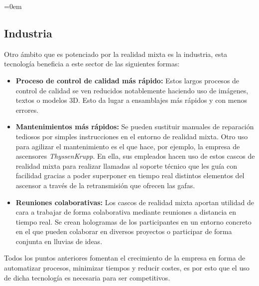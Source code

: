 \parindent=0em
\subsection{Industria}
\noindent




Otro ámbito que es potenciado por la realidad mixta es la industria, esta tecnología beneficia a este sector de las siguientes formas:

\begin{itemize}
    \item \textbf{Proceso de control de calidad más rápido:} Estos largos procesos de control de calidad se ven reducidos notablemente haciendo uso de imágenes, textos o modelos 3D. Esto da lugar a ensamblajes más rápidos y con menos errores.
    
     \item \textbf{Mantenimientos más rápidos:} Se pueden sustituir manuales de reparación tediosos por simples instrucciones en el entorno de realidad mixta. Otro uso para agilizar el mantenimiento es el que hace, por ejemplo, la empresa de ascensores \textit{ThyssenKrupp}. En ella, sus empleados hacen uso de estos cascos de realidad mixta para realizar llamadas al soporte técnico que les guía con facilidad gracias a poder superponer en tiempo real distintos elementos del ascensor a través de la retransmisión que ofrecen las gafas.
     
     \item \textbf{Reuniones colaborativas:} Los cascos de realidad mixta aportan utilidad de cara a trabajar de forma colaborativa mediante reuniones a distancia en tiempo real. Se crean hologramas de los participantes en un entorno concreto en el que pueden colaborar en diversos proyectos o participar de forma conjunta en lluvias de ideas.
     
\end{itemize}

 Todos los puntos anteriores fomentan el crecimiento de la empresa en forma de automatizar procesos, minimizar tiempos y reducir costes, es por esto que el uso de dicha tecnología es necesaria para ser competitivos.\\

